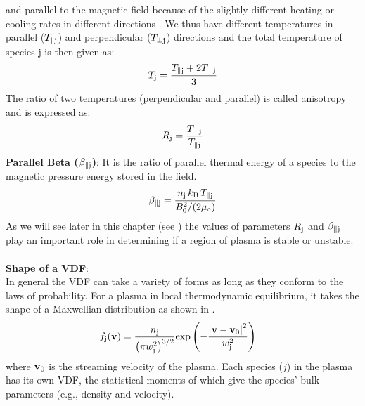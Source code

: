             and parallel to the magnetic field because of the slightly different heating or cooling
            rates in different directions \citep{Stix1992, Gary1993}. We thus have different
            temperatures in parallel ($T_{\rm \parallel j}$) and perpendicular ($T_{\rm \perp j}$)
            directions and the total temperature of species j is then given as:
            \begin{align}
                 T_{\rm j} = \frac{T_{\rm \parallel j} + 2 T_{\rm \perp j}}{3} \label{eq:ttemp}
            \end{align}
            The ratio of two temperatures (perpendicular and parallel) is called anisotropy and is
            expressed as:
            \begin{align}
                 R_{\rm j} = \frac{T_{\rm \rm \perp j}}{T_{\rm \parallel j}} \label{eq:aniso}
            \end{align}
            \textbf{Parallel Beta ($\beta_{\rm \parallel j}$)}: It is the ratio of parallel thermal
            energy of a species to the magnetic pressure energy stored in the field.
            \begin{align}
                \beta_{\rm \parallel j} = \frac{n_{\rm j}\,k_{\rm B}\,T_{\rm \parallel j}}{B_0^2/(2\mu_\circ)} \label{eq:beta}
            \end{align}
            As we will see later in this chapter (see ) the values of parameters
            $R_{\rm j}$ and $\beta_{\rm \parallel j}$ play an important role in determining if a
            region of plasma is stable or unstable. \\
            \\
            \textbf{Shape of a VDF}:\\
            In general the VDF can take a variety of forms as long as they conform to the laws of
            probability. For a plasma in local thermodynamic equilibrium, it takes the shape of a
            Maxwellian distribution as shown in .
            \begin{align}
                \mathnormal{f}_{\rm j}(\mathbf{v}) & = \frac{n_{\rm j}}{\left(\pi w_{\rm j}^2\right)^{3/2}} \mathrm{exp}\left(-\frac{\left|\mathbf{v} - \mathbf{v}_{\rm 0}\right|^2}{w_{\rm j}^2}\right) \label{eq:vdf}
            \end{align}
            where $\mathbf{v}_{\rm 0}$ is the streaming velocity of the plasma. Each species ($j$)
            in the plasma has its own VDF, the statistical moments of which give the species' bulk
            parameters (e.g., density and velocity).

